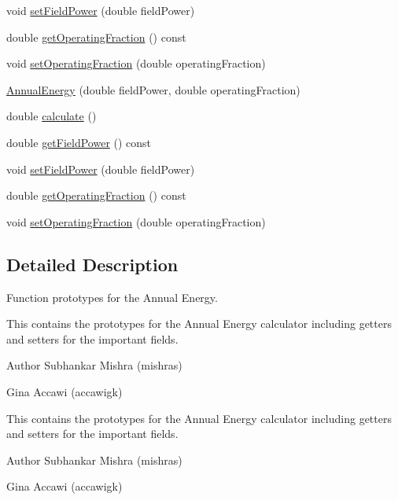 \begin{DoxyCompactItemize}
\item 
void \hyperlink{class_annual_energy_a4f7212fcf2f6fcd2b12f36ca26a368a1}{set\+Field\+Power} (double field\+Power)
\item 
double \hyperlink{class_annual_energy_a51c2bd68a5268ec9bafe3c70b3a7a6ad}{get\+Operating\+Fraction} () const
\item 
void \hyperlink{class_annual_energy_a5c127c7d5e2a5e4f50559f8b546e8998}{set\+Operating\+Fraction} (double operating\+Fraction)
\item 
\hyperlink{class_annual_energy_a5e446ce85879bafeac8fc992cb5b9ed7}{Annual\+Energy} (double field\+Power, double operating\+Fraction)
\item 
double \hyperlink{class_annual_energy_ab599860ffb32ce20a1042a3e9d2ad57f}{calculate} ()
\item 
double \hyperlink{class_annual_energy_a52aa52274243f578ea7f92d27707cacb}{get\+Field\+Power} () const
\item 
void \hyperlink{class_annual_energy_a4f7212fcf2f6fcd2b12f36ca26a368a1}{set\+Field\+Power} (double field\+Power)
\item 
double \hyperlink{class_annual_energy_a51c2bd68a5268ec9bafe3c70b3a7a6ad}{get\+Operating\+Fraction} () const
\item 
void \hyperlink{class_annual_energy_a5c127c7d5e2a5e4f50559f8b546e8998}{set\+Operating\+Fraction} (double operating\+Fraction)
\end{DoxyCompactItemize}


\subsection{Detailed Description}
Function prototypes for the Annual Energy. 

This contains the prototypes for the Annual Energy calculator including getters and setters for the important fields.

\begin{DoxyAuthor}{Author}
Subhankar Mishra (mishras) 

Gina Accawi (accawigk) 
\end{DoxyAuthor}


This contains the prototypes for the Annual Energy calculator including getters and setters for the important fields.

\begin{DoxyAuthor}{Author}
Subhankar Mishra (mishras) 

Gina Accawi (accawigk) 
\end{DoxyAuthor}


